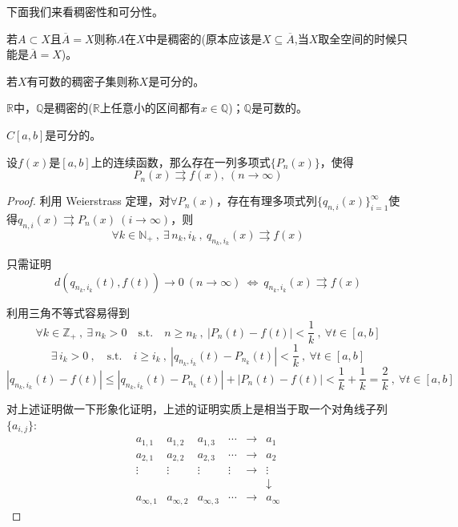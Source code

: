 下面我们来看稠密性和可分性。
\begin{definition}[稠密性]
    若$A \subset X$且$\overline{A}=X$则称$A$在$X$中是稠密的(原本应该是$X \subseteq \overline{A}$,当$X$取全空间的时候只能是$\overline{A}=X$)。
\end{definition}
\begin{definition}[可分性]
    若$X$有可数的稠密子集则称$X$是可分的。
\end{definition}
\begin{example}  \quad $\mathbb{R}$中，$\mathbb{Q}$是稠密的($\mathbb{R}$上任意小的区间都有$x \in \mathbb{Q}$)；$\mathbb{Q}$是可数的。
\end{example}
\begin{example}
 \quad $C[a,b]$是可分的。
\end{example}
\begin{theorem}[Weierstrass 定理]\label{theorem:Weierstrass}
设$f(x)$是$[a,b]$上的连续函数，那么存在一列多项式$\{P_n(x)\}$，使得
\[P_n(x) \rightrightarrows f(x), \ (n \rightarrow \infty)\]
\end{theorem}
\begin{proof}利用 Weierstrass 定理，对$\forall P_n(x)$，存在有理多项式列$\{q_{n,i}(x)\}_{i=1}^{\infty}$使得$q_{n,i}(x) \rightrightarrows P_n(x) \ (i \rightarrow \infty)$，则
\[\forall k \in \mathbb{N}_+ \ , \ \exists \, n_k,i_k \ , \ q_{n_k,i_k}(x) \rightrightarrows f(x)\]

只需证明
\[d(q_{n_k,i_k}(t),f(t)) \rightarrow 0 \ (n \rightarrow \infty) \ \Leftrightarrow \ q_{n_k,i_k}(x) \rightrightarrows f(x)\]

利用三角不等式容易得到
\[\forall k \in \mathbb{Z}_+ \ , \ \exists \, n_k>0 \quad \text{s.t.} \quad n \geq n_k \ , \ |P_n(t)-f(t)|<\frac{1}{k} \ , \ \forall t \in [a,b]\]
\[\exists \, i_k>0 \ , \quad \text{s.t.} \quad i \geq i_k \ , \ |q_{n_k,i_k}(t)-P_{n_k}(t)|<\frac{1}{k} \ , \ \forall t \in [a,b]\]
\[|q_{n_k,i_k}(t)-f(t)| \leq |q_{n_k,i_k}(t)-P_{n_k}(t)|+|P_n(t)-f(t)|<\frac{1}{k}+\frac{1}{k}=\frac{2}{k} \ , \ \forall t \in [a,b]\]

对上述证明做一下形象化证明，上述的证明实质上是相当于取一个对角线子列$\{a_{i,j}\}$:
\[
\begin{array}{cccccc}
    a_{1,1} & a_{1,2} & a_{1,3} & \cdots & \rightarrow & a_1 \\
    a_{2,1} & a_{2,2} & a_{2,3} & \cdots & \rightarrow & a_2 \\
    \vdots & \vdots & \vdots & \vdots & \rightarrow & \vdots \\
      &   &   &   &   & \downarrow \\
    a_{\infty,1} & a_{\infty,2} & a_{\infty,3} & \cdots & \rightarrow & a_{\infty}
\end{array}    
\]

\end{proof}
